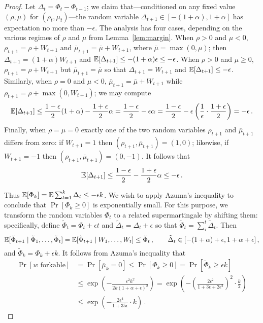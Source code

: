 \begin{proof}
  Let $\Delta_t = \Phi_t - \Phi_{t-1}$; we claim that---conditioned
  on any fixed value $(\rho, \mu)$ for $(\rho_t, \mu_t)$---the
  random variable $\Delta_{t+1} \in [-(1 + \alpha),1+ \alpha]$ has
  expectation no more than $-\epsilon$. The analysis has four cases,
  depending on the various regimes of $\rho$ and $\mu$ from Lemma~\ref{lem:margin}. 
  When $\rho > 0$ and $\mu < 0$,
  $\rho_{t+1} = \rho + W_{t+1}$ and
  $\overline{\mu}_{t+1} = \overline{\mu} + W_{t+1}$, where
  $\overline{\mu} = \max(0,\mu)$; then
  $\Delta_{t+1} = (1 + \alpha)W_{t+1}$ and
  $\operatorname{\mathbb{E}}[\Delta_{t+1} ] \leq -(1 + \alpha)\epsilon \leq -\epsilon$. When
  $\rho > 0$ and $\mu \geq 0$, $\rho_{t+1} = \rho + W_{t+1}$
  but $\overline{\mu}_{t+1} = \overline{\mu}$ so that
  $\Delta_{t+1} = W_{t+1}$ and $\operatorname{\mathbb{E}}[\Delta_{t+1} ] \leq -\epsilon$. Similarly, when
  $\rho = 0$ and $\mu < 0$,
  $\overline{\mu}_{t+1} = \overline{\mu} + W_{t+1}$ while
  $\rho_{t+1} = \rho + \max(0, W_{t+1})$; we may compute
  \[
    \operatorname{\mathbb{E}}[\Delta_{t+1} ] \leq \frac{1 - \epsilon}{2}(1 + \alpha) - \frac{1 +
      \epsilon}{2}\alpha = \frac{1 - \epsilon}{2} - \epsilon\alpha =
    \frac{1 - \epsilon}{2} - \epsilon\left(\frac{1}{\epsilon} \cdot
      \frac{1 + \epsilon}{2}\right) = -\epsilon\,.
  \]
  Finally, when $\rho = \mu = 0$ exactly one of the two random
  variables $\rho_{t+1}$ and $\overline{\mu}_{t+1}$ differs from
  zero: if $W_{t+1} = 1$ then
  $(\rho_{t+1}, \overline{\mu}_{t+1}) = (1,0)$; likewise, if
  $W_{t+1} = -1$ then
  $(\rho_{t+1}, \overline{\mu}_{t+1}) = (0,-1)$. It follows that
  \[
    \operatorname{\mathbb{E}}[\Delta_{t+1} ] \leq \frac{1 - \epsilon}{2} - \frac{1 +
      \epsilon}{2}\alpha \leq -\epsilon\,.
  \]

  \noindent
  Thus $
  \operatorname{\mathbb{E}}[\Phi_k] = \operatorname{\mathbb{E}} \sum_{t=1}^k \Delta_t  
  \leq -\epsilon k
  $. 
  We wish to apply Azuma's inequality to conclude that
  $\Pr[\Phi_k \geq 0]$ is exponentially small. For this purpose, we
  transform the random variables $\Phi_t$ to a related supermartingale by
  shifting them: specifically, define
  $\tilde{\Phi}_t = \Phi_t + \epsilon t$ and
  $\tilde{\Delta}_t = \Delta_t + \epsilon$ so that
  $\tilde{\Phi}_t = \sum_i^t \tilde{\Delta}_t$. Then
  \[
    \operatorname{\mathbb{E}}[\tilde{\Phi}_{t+1} \mid \tilde{\Phi}_1, \ldots,
    \tilde{\Phi}_{t}] = \operatorname{\mathbb{E}}[\tilde{\Phi}_{t+1} \mid W_1, \ldots,
    W_{t}]\leq \tilde{\Phi}_t\,,
    \qquad
    \tilde{\Delta}_t \in [-(1 + \alpha) + \epsilon, 1+ \alpha +
    \epsilon]\,,
  \]
  and $\tilde{\Phi}_k = \Phi_k + \epsilon k$. It follows
  from Azuma's inequality that
  \begin{align}\label{eq:azuma-bound}
    \Pr[\text{$w$ forkable}] 
    &= \Pr[\overline{\mu}_k = 0] \leq \Pr[\Phi_k \geq 0] = \Pr[\tilde{\Phi}_k \geq \epsilon k] 
    \nonumber \\ 
    &\leq \exp\left(-\frac{\epsilon^2 k^2}{2k (1 + \alpha + \epsilon)^2}\right)
       = \exp\left(-\left(\frac{2 \epsilon^2}{1 + 3 \epsilon + 2\epsilon^2}\right)^2 \cdot \frac{k}{2}\right) \nonumber \\
    &\leq \exp\left(-\frac{2\epsilon^4}{1 + 35\epsilon} \cdot k\right)
    \,.
  \end{align}



\end{proof}
